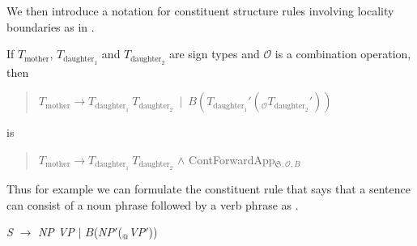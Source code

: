 We then introduce a notation for constituent structure rules involving
locality boundaries as in \nexteg{}.
\begin{ex} 
If $T_{\text{mother}}$, $T_{\text{daughter}_1}$ and
  $T_{\text{daughter}_2}$ are sign types and $\mathcal{O}$ is a
  combination operation, then
  \begin{quote}
    $T_{\text{mother}}\longrightarrow
    T_{\text{daughter}_1}\ T_{\text{daughter}_2}\ \mid\
    B(T_{\text{daughter}_1}'(_{\mathcal{O}}T_{\text{daughter}_2}'))$
  \end{quote}
  is
  \begin{quote}
  $T_{\text{mother}}\longrightarrow
    T_{\text{daughter}_1}\ T_{\text{daughter}_2}$ \d{\d{$\wedge$}}
    ContForwardApp$_{\mathfrak{S},\mathcal{O},B}$
  \end{quote}
  
\end{ex} 
Thus for example we can formulate the constituent rule that says
that a sentence can consist of a noun phrase followed by a verb phrase
as \nexteg{}.
\begin{ex} 
  \textit{S} $\longrightarrow$ \textit{NP VP} $\mid$ $B$(\textit{NP}$'$($_{\text{@}}$\textit{VP}$'$))
\end{ex} 
  
